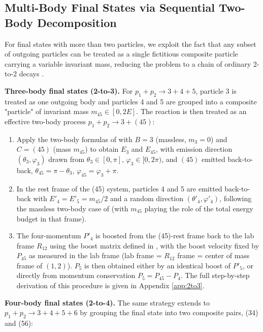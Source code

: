 \documentclass{article}
\begin{document}
\subsection{Multi-Body Final States via Sequential Two-Body Decomposition}
For final states with more than two particles, we exploit the fact that any subset of outgoing particles can be treated as a single fictitious composite particle carrying a variable invariant mass, reducing the problem to a chain of ordinary 2-to-2 decays \cite{byckling_kajantie}.
\par\textbf{Three-body final states (2-to-3).}
\label{para:2to3} For $p_1 + p_2 \rightarrow 3+4+5$, particle 3 is treated as one outgoing body and particles 4 and 5 are grouped into a composite "particle" of invariant mass $m_{45} \in [0,2E]$. The reaction is then treated as an effective two-body process $p_1 + p_2 \rightarrow 3+(45)$:
\begin{enumerate}
    \item Apply the two-body formulas of  with $B=3$ (massless, $m_3 = 0$) and $C=(45)$ (mass $m_{45}$) to obtain $E_3$ and $E_{45}$, with emission direction $(\theta_3, \varphi_3)$ drawn from $\theta_3 \in [0,\pi]$, $\varphi_3 \in [0, 2\pi)$, and $(45)$ emitted back-to-back, $\theta_{45} = \pi - \theta_3$, $\varphi_{45} = \varphi_3 + \pi$.
    \item In the rest frame of the (45) system, particles 4 and 5 are emitted back-to-back with $E'_4 = E'_5 = m_{45}/2$ and a random direction $(\theta'_4, \varphi'_4)$, following the massless two-body case of  (with $m_{45}$ playing the role of the total energy budget in that frame).
    \item The four-momentum $P'_4$ is boosted from the (45)-rest frame back to the lab frame $R_{12}$ using the boost matrix defined in , with the boost velocity fixed by $P_{45}$ as measured in the lab frame (lab frame = $R_{12}$ frame = center of mass frame of $(1,2)$). $P_5$ is then obtained either by an identical boost of $P'_5$, or directly from momentum conservation $P_5=P_{45}-P_4$. The full step-by-step derivation of this procedure is given in Appendix \ref{app:2to3}.
\end{enumerate}
\par\textbf{Four-body final states (2-to-4).}
\label{para:2to4} The same strategy extends to $p_1 + p_2 \rightarrow 3+4+5+6$ by grouping the final state into two composite pairs, (34) and (56):
\end{document}
